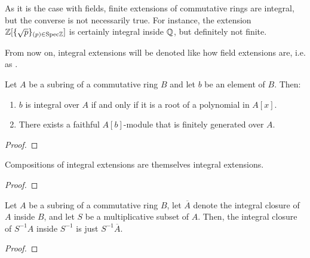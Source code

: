             \begin{remark} \label{remark: finite_implies_integral}
                As it is the case with fields, finite extensions of commutative rings are integral, but the converse is not necessarily true. For instance, the extension $\mathbb{Z}[\{\sqrt{p}\}_{(p) \in \mathrm{Spec} \mathbb{Z}}]$ is certainly integral inside $\mathbb{Q}$, but definitely not finite. 
            \end{remark}
            \begin{convention}
                From now on, integral extensions will be denoted like how field extensions are, i.e. as .
            \end{convention}
            
            \begin{proposition}
                Let $A$ be a subring of a commutative ring $B$ and let $b$ be an element of $B$. Then:
                    \begin{enumerate}
                        \item $b$ is integral over $A$ if and only if it is a root of a polynomial in $A[x]$. 
                        \item There exists a faithful $A[b]$-module that is finitely generated over $A$. 
                    \end{enumerate}
            \end{proposition}
                \begin{proof}
                                
                \end{proof}
            
            \begin{proposition}
                Compositions of integral extensions are themselves integral extensions. 
            \end{proposition}
                \begin{proof}
                                
                \end{proof}
            
            \begin{proposition}
                Let $A$ be a subring of a commutative ring $B$, let $\overline{A}$ denote the integral closure of $A$ inside $B$, and let $S$ be a multiplicative subset of $A$. Then, the integral closure of $S^{-1}A$ inside $S^{-1}$ is just $S^{-1}\overline{A}$. 
            \end{proposition}
                \begin{proof}
                                
                \end{proof}
            
